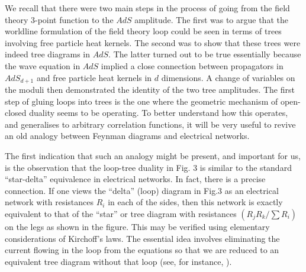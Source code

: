 We recall that there were two main 
steps in the process of going from the field theory 3-point function
to the $AdS$ amplitude. The first was to argue that the worldline formulation of the
field theory loop could be seen in terms of trees involving free particle heat kernels. 
The second was to show that these trees were indeed tree diagrams in $AdS$. The latter turned out 
to be true essentially because
the wave equation in $AdS$ implied 
a close connection between propagators in $AdS_{d+1}$ and free particle heat kernels 
in $d$ dimensions. A change of variables on the moduli then demonstrated the identity of the 
two tree amplitudes. The first step of gluing loops into trees
is the one where the geometric mechanism of open-closed duality seems to be operating.  
To better understand how this operates, and generalises to arbitrary correlation functions, 
it will be very useful to revive an old analogy between Feynman diagrams and electrical networks. 

The first indication that such an analogy might be present, and important for us,
is the observation that the loop-tree duality in Fig. 3 is  
similar to the standard 
``star-delta'' equivalence in electrical networks. In fact, 
there is a precise connection. If one views the ``delta'' (loop) diagram in Fig.3 as an 
electrical network with resistances $R_i$ in each of the sides, then this network is exactly
equivalent to that of the ``star'' or tree diagram with resistances $(R_jR_k/\sum R_i)$ 
on the legs as 
shown in the figure. 
This may be verified using elementary considerations of Kirchoff's laws.
The essential idea involves eliminating the current flowing in the loop from the equations
so that we are reduced to an equivalent tree diagram without that loop 
(see, for instance, \guil ). 

